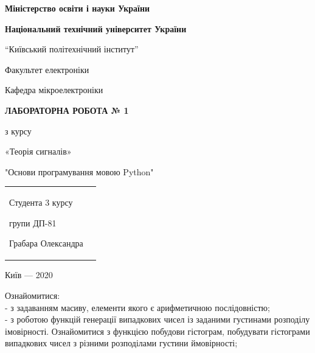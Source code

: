 \documentclass[a4paper,12pt]{article}
\begin{document}
\pagecolor{white}
\pagestyle{plain}
\begin{center}
   \begin{center} 
   \large{\textbf{Міністерство освіти і науки України} \par 
   \textbf{Національний технічний університет України}}\par
	“Київський політехнічний інститут”\par
	 Факультет електроніки\par
    	Кафедра мікроелектроніки\par
    \end{center}
    \vspace{4cm}
    
   	{\bfseries ЛАБОРАТОРНА РОБОТА № 1\par}
        \vspace{1cm}
        \large
        {
    	з курсу\par
    	«Теорія сигналів» \par
      	"Основи програмування мовою Python" \par  
	}
	\end{center}

       \vspace{7cm}
       \begin{tabularx}{\textwidth}{Xr}
        \flushright
           \begin{large} 
        Студента 3 курсу\par
 	групи ДП-81\par
	Грабара Олександра\par
	 \end{large}
	\end{tabularx}
   
   \vfill
   \begin{center}
    {Київ} --- 2020
    \end{center}
 \newpage   

\begin{center}
\textbf{}\par
\end{center}
Ознайомитися:\\
- з задаванням масиву, елементи якого є арифметичною послідовністю;\\
- з роботою функцій генерації випадкових чисел із заданими густинами розподілу імовірності. Ознайомитися з функцією побудови гістограм, побудувати гістограми випадкових чисел з різними розподілами густини ймовірності;\\
\end{document}
